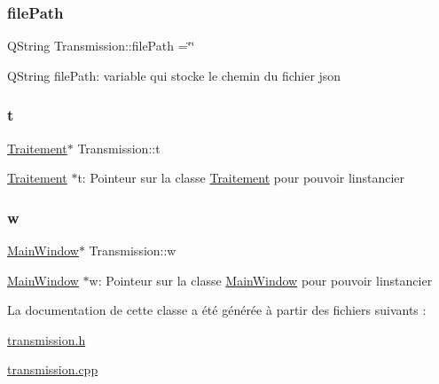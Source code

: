 \subsubsection{\texorpdfstring{file\+Path}{filePath}}
{\footnotesize\ttfamily Q\+String Transmission\+::file\+Path =\char`\"{}\char`\"{}\hspace{0.3cm}{\ttfamily [private]}}

Q\+String file\+Path\+: variable qui stocke le chemin du fichier json \mbox{\label{classTransmission_ad05ceda47dcb0763e32e03e089defdb0}} 
\subsubsection{\texorpdfstring{t}{t}}
{\footnotesize\ttfamily \hyperlink{classTraitement}{Traitement}$\ast$ Transmission\+::t\hspace{0.3cm}{\ttfamily [private]}}

\hyperlink{classTraitement}{Traitement} $\ast$t\+: Pointeur sur la classe \hyperlink{classTraitement}{Traitement} pour pouvoir l\textquotesingle{}instancier \mbox{\label{classTransmission_a46ff40b83d046581408dce2027139fe0}} 
\subsubsection{\texorpdfstring{w}{w}}
{\footnotesize\ttfamily \hyperlink{classMainWindow}{Main\+Window}$\ast$ Transmission\+::w\hspace{0.3cm}{\ttfamily [private]}}

\hyperlink{classMainWindow}{Main\+Window} $\ast$w\+: Pointeur sur la classe \hyperlink{classMainWindow}{Main\+Window} pour pouvoir l\textquotesingle{}instancier 

La documentation de cette classe a été générée à partir des fichiers suivants \+:\begin{DoxyCompactItemize}
\item 
\hyperlink{transmission_8h}{transmission.\+h}\item 
\hyperlink{transmission_8cpp}{transmission.\+cpp}\end{DoxyCompactItemize}
